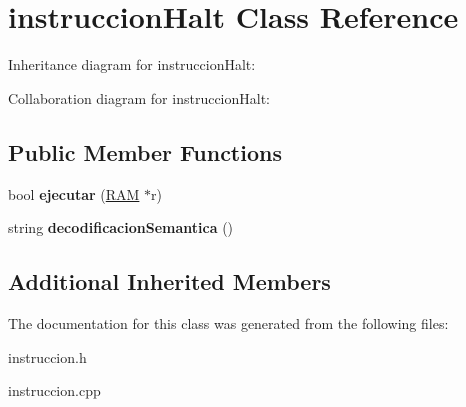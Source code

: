 \hypertarget{classinstruccionHalt}{}\section{instruccion\+Halt Class Reference}
\label{classinstruccionHalt}


Inheritance diagram for instruccion\+Halt\+:


Collaboration diagram for instruccion\+Halt\+:
\subsection*{Public Member Functions}
\begin{DoxyCompactItemize}
\item 
\hypertarget{classinstruccionHalt_a54236103a49dcc1c94eb26c4b8976626}{}bool {\bfseries ejecutar} (\hyperlink{classRAM}{R\+A\+M} $\ast$r)\label{classinstruccionHalt_a54236103a49dcc1c94eb26c4b8976626}

\item 
\hypertarget{classinstruccionHalt_a8a5bdd51880cb3f4e7b79e9f219e3a33}{}string {\bfseries decodificacion\+Semantica} ()\label{classinstruccionHalt_a8a5bdd51880cb3f4e7b79e9f219e3a33}

\end{DoxyCompactItemize}
\subsection*{Additional Inherited Members}


The documentation for this class was generated from the following files\+:\begin{DoxyCompactItemize}
\item 
instruccion.\+h\item 
instruccion.\+cpp\end{DoxyCompactItemize}
